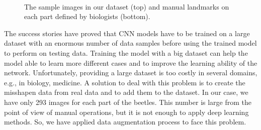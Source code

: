 \documentclass[review]{elsarticle}
\begin{document}
\begin{figure}[h!]
~~
~~
~\\
    \caption{The sample images in our dataset (top) and manual landmarks on each part defined by biologists (bottom).}
    \label{figdatasamples}
\end{figure}

The success stories \cite{krizhevsky2012imagenet, ciregan2012multi,
  szegedy2015going} have proved that CNN models have to be trained on
a large dataset with an enormous number of data samples before using
the trained model to perform on testing data. Training the model with
a big dataset can help the model able to learn more different cases
and to improve the learning ability of the network. Unfortunately,
providing a large dataset is too costly in several domains, e.g., in
biology, medicine. A solution to deal with this problem is to create
the misshapen data from real data and to add them to the dataset. In
our case, we have only 293 images for each part of the beetles. This
number is large from the point of view of manual operations, but it is
not enough to apply deep learning methods. So, we have applied data
augmentation process to face this problem.
\end{document}
